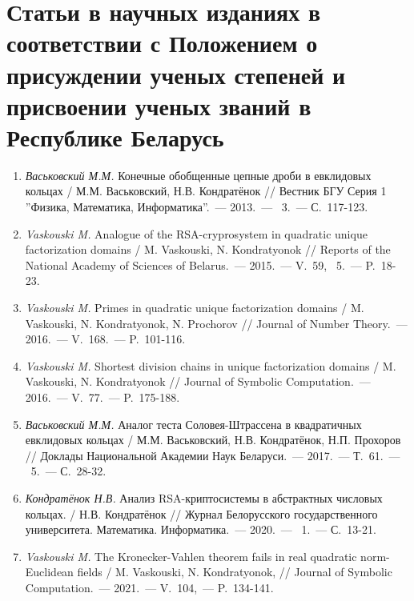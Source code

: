 \vspace{-4ex}
\section*{\fontsize{14}{15}\selectfont Статьи в научных изданиях в соответствии с Положением о присуждении ученых степеней и присвоении ученых званий в Республике Беларусь}
\vspace{-4ex}

\begin{enumerate}

    \item \label{source:Vestnik_BSU_2013}
    \textit{Васьковский М.М.} Конечные обобщенные цепные дроби в евклидовых кольцах / М.М. Васьковский, Н.В. Кондратёнок // Вестник БГУ Серия 1 ''Физика, Математика, Информатика''.~--- 2013.~--- \textnumero~3.~--- С.~117-123.

    \item \label{source:NANB_2015}
    \textit{Vaskouski M.} Analogue of the RSA-cryprosystem in quadratic unique facto\-rization domains / M. Vaskouski, N. Kondratyonok // Reports of the National Academy of Sciences of Belarus.~--- 2015.~--- V.~59, \textnumero~5.~--- P.~18-23.

    \item \label{source:JNT_2016}
    \textit{Vaskouski M.} Primes in quadratic unique factorization domains / M. Vaskouski, N. Kondratyonok, N. Prochorov // Journal of Number Theory.~--- 2016.~--- V.~168.~--- P.~101-116.

    \item \label{source:JSC_2016}
    \textit{Vaskouski M.} Shortest division chains in unique factorization domains / M. Vaskouski, N. Kondratyonok // Journal of Symbolic Computation.~--- 2016.~--- V.~77.~--- P.~175-188.

    \item \label{source:NANB_2017}
    \textit{Васьковский М.М.} Аналог теста Соловея-Штрассена в квадратичных евклидовых кольцах / М.М. Васьковский, Н.В. Кондратёнок, Н.П. Прохоров // Доклады Национальной Академии Наук Беларуси.~--- 2017.~--- Т.~61.~--- \textnumero~5.~--- С.~28-32.

    \item \label{source:BSU_Journal_2020}
    \textit{Кондратёнок Н.В.} Анализ RSA-криптосистемы в абстрактных числовых кольцах. / Н.В. Кондратёнок // Журнал Белорусского государственного университета. Математика. Информатика.~--- 2020.~--- \textnumero~1.~--- С.~13-21.

    \item \label{source:JSC_2021}
    \textit{Vaskouski M.} The Kronecker-Vahlen theorem fails in real quadratic norm-Eucli\-dean fields / M. Vaskouski, N. Kondratyonok, // Journal of Symbolic Computation.~--- 2021.~--- V.~104,~--- P.~134-141.

\end{enumerate}

